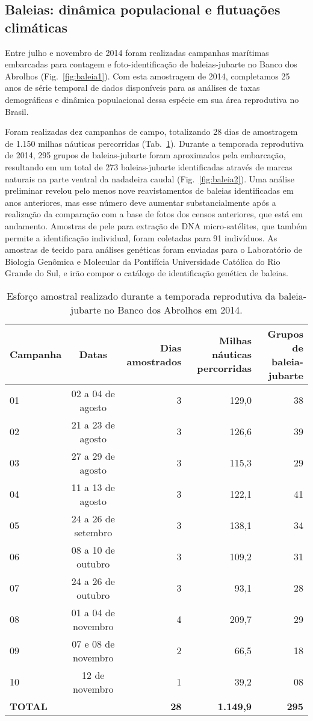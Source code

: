 \subsection{Baleias: dinâmica populacional e flutuações climáticas} %
\label{sec:dinam-popul-de} 

Entre julho e novembro de 2014 foram realizadas campanhas marítimas
embarcadas para contagem e foto-identificação de baleias-jubarte no
Banco dos Abrolhos (Fig.~\ref{fig:baleia1}). 
Com esta amostragem de 2014, completamos 25
anos de série temporal de dados disponíveis para as análises de taxas
demográficas e dinâmica populacional dessa espécie em sua área
reprodutiva no Brasil.


Foram realizadas dez campanhas de campo, totalizando 28 dias de
amostragem de 1.150 milhas náuticas percorridas
(Tab.~\ref{tab:baleia1}). Durante a temporada reprodutiva de 2014,
295 grupos de baleias-jubarte foram aproximados pela embarcação,
resultando em um total de 273 baleias-jubarte identificadas através de
marcas naturais na parte ventral da nadadeira caudal (Fig.~\ref{fig:baleia2}). 
Uma análise preliminar revelou pelo menos nove reavistamentos de
baleias identificadas em anos anteriores, mas esse número deve
aumentar substancialmente após a realização da comparação com
a base de fotos dos censos anteriores,
que está em andamento. Amostras de pele para extração de DNA
micro-satélites, que também permite a identificação individual, foram
coletadas para 91 indivíduos. As amostras de tecido para análises
genéticas foram enviadas para o Laboratório de Biologia
Genômica e Molecular da Pontifícia Universidade Católica do Rio Grande
do Sul, e irão compor o catálogo de identificação genética de baleias.

\begin{table}
  \label{tab:baleia1}    
\caption{Esforço amostral realizado durante a temporada reprodutiva da baleia-jubarte no Banco dos Abrolhos em 2014.}
\begin{tabular}{lcrrr}
    \hline  
    \textbf{Campanha} & \textbf{Datas} & \textbf{Dias amostrados} & \textbf{Milhas náuticas percorridas} & \textbf{Grupos de baleia-jubarte} \\
  \hline
    01 & 02 a 04 de agosto & 3 & 129,0 & 38 \\
    02 & 21 a 23 de agosto & 3 & 126,6 & 39 \\
    03 & 27 a 29 de agosto & 3 & 115,3 & 29 \\
    04 & 11 a 13 de agosto & 3 & 122,1 & 41 \\
    05 & 24 a 26 de setembro & 3 & 138,1 & 34 \\
    06 & 08 a 10 de outubro & 3 & 109,2 & 31 \\
    07 & 24 a 26 de outubro & 3 & 93,1 & 28 \\
    08 & 01 a 04 de novembro & 4 & 209,7 & 29 \\
    09 & 07 e 08 de novembro & 2 & 66,5 & 18 \\
    10 & 12 de novembro & 1 & 39,2 & 08 \\
    \textbf{TOTAL} & & \textbf{28} & \textbf{1.149,9} & \textbf{295} \\
  \hline
  \end{tabular}
\end{table}


